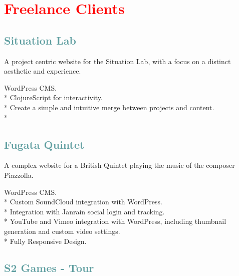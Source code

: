 

\newpage
\section{\textcolor{red}{Freelance Clients}}

\subsection{\textcolor{CadetBlue}{\LARGE{Situation Lab}}}

A project centric website for the Situation Lab, with a focus on a distinct aesthetic and experience.

WordPress CMS. \\*
ClojureScript for interactivity. \\*
Create a simple and intuitive merge between projects and content.\\*

\subsection{\textcolor{CadetBlue}{\LARGE{Fugata Quintet}}}

A complex website for a British Quintet playing the music of the composer Piazzolla.

WordPress CMS. \\*
Custom SoundCloud integration with WordPress. \\*
Integration with Janrain social login and tracking.\\*
YouTube and Vimeo integration with WordPress, including thumbnail generation and custom video settings.\\*
Fully Responsive Design.

\subsection{\textcolor{CadetBlue}{\LARGE{S2 Games - Tour}}}
\marginnote{\textcolor{gray}{2011}}

